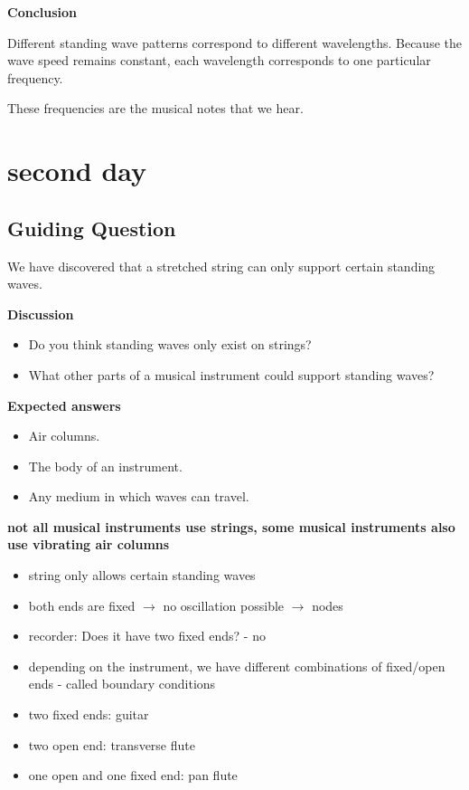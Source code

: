 \documentclass[a4paper,11pt]{article}
\begin{document}
\textbf{Conclusion}

Different standing wave patterns correspond to different wavelengths.
Because the wave speed remains constant, each wavelength corresponds to one particular frequency.

These frequencies are the musical notes that we hear.


\section{second day}
\subsection*{Guiding Question}

We have discovered that a stretched string can only support certain standing waves.

\textbf{Discussion}

\begin{itemize}
    \item Do you think standing waves only exist on strings?
    \item What other parts of a musical instrument could support standing waves?
\end{itemize}

\textbf{Expected answers}

\begin{itemize}
    \item Air columns.
    \item The body of an instrument.
    \item Any medium in which waves can travel.
\end{itemize}

\textbf{not all musical instruments use strings, some musical instruments also use vibrating air columns}

\begin{itemize}
    \item string only allows certain standing waves
    \item both ends are fixed $\rightarrow $ no oscillation possible  $\rightarrow $  nodes
    \item recorder: Does it have two fixed ends? - no
    \item depending on the instrument, we have different combinations of fixed/open ends  - called boundary conditions
    \item two fixed ends: guitar 
    \item two open end: transverse flute 
    \item one open and one fixed end: pan flute
\end{itemize}
\end{document}
